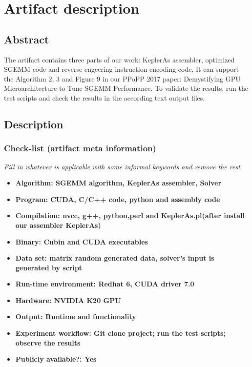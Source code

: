 \section{Artifact description}


\subsection{Abstract}

The artifact contains three parts of our work: KeplerAs assembler, optimized SGEMM code and reverse engeering instruction encoding code. It can support the Algorithm $2$, $3$ and Figure $9$ in our PPoPP 2017 paper: Demystifying GPU Microarchitecture to Tune SGEMM Performance. To validate the results, run the test scripts and check the results in the according text output files.

\subsection{Description}

\subsubsection{Check-list (artifact meta information)}

{\em Fill in whatever is applicable with some informal keywords and remove the rest}

{\small
\begin{itemize}
  \item {\bf Algorithm: SGEMM algorithm, KeplerAs assembler, Solver}
  \item {\bf Program: CUDA, C/C++ code, python and assembly code}
  \item {\bf Compilation: nvcc, g++, python,perl and KeplerAs.pl(after install our assembler KeplerAs)}
  \item {\bf Binary: Cubin and CUDA executables}
  \item {\bf Data set: matrix random generated data, solver's input is generated by script}
  \item {\bf Run-time environment: Redhat 6, CUDA driver 7.0}
  \item {\bf Hardware: NVIDIA K20 GPU}
  \item {\bf Output: Runtime and functionality}
  \item {\bf Experiment workflow: Git clone project; run the test scripts; observe the results}
  \item {\bf Publicly available?: Yes }
\end{itemize}
}

